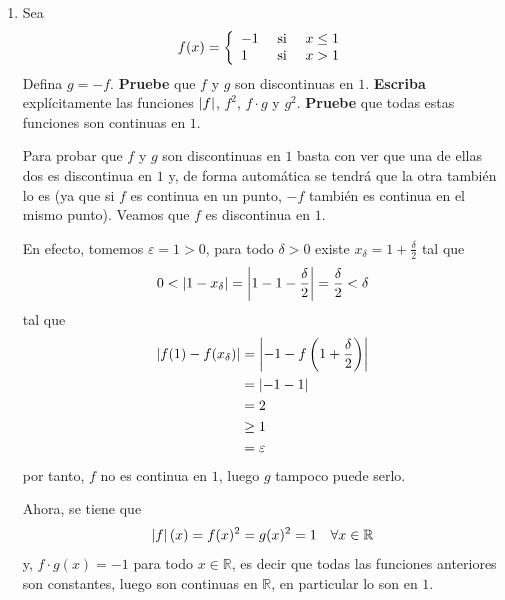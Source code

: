\documentclass[12pt]{article}
\begin{document}
\begin{enumerate}
    \item Sea
    \begin{equation*}
        f(x)=\left\{
            \begin{array}{lcr}
                -1 & \textup{ si } & x\leq 1 \\
                1 & \textup{ si } & x>1 \\
            \end{array}
        \right.
    \end{equation*}
    Defina $g=-f$. \textbf{Pruebe} que $f$ y $g$ son discontinuas en $1$. \textbf{Escriba} explícitamente las funciones $\left| f \right|$, $f^2$, $f\cdot g$ y $g^2$. \textbf{Pruebe} que todas estas funciones son continuas en $1$.

    \begin{sol}
        Para probar que $f$ y $g$ son discontinuas en $1$ basta con ver que una de ellas dos es discontinua en $1$ y, de forma automática se tendrá que la otra también lo es (ya que si $f$ es continua en un punto, $-f$ también es continua en el mismo punto). Veamos que $f$ es discontinua en $1$.
        
        En efecto, tomemos $\varepsilon=1>0$, para todo $\delta>0$ existe $x_\delta=1+\frac{\delta}{2}$ tal que
        \begin{equation*}
            \begin{split}
                0<\left| 1-x_\delta \right|=\left| 1-1-\frac{\delta}{2} \right|=\frac{\delta}{2}<\delta
            \end{split}
        \end{equation*}
        tal que
        \begin{equation*}
            \begin{split}
                \left| f(1)-f(x_\delta) \right|&=\left| -1-f\left(1+\frac{\delta}{2}\right) \right|\\
                &=\left| -1-1 \right|\\
                &=2\\
                &\geq1\\
                &=\varepsilon\\
            \end{split}
        \end{equation*}
        por tanto, $f$ no es continua en $1$, luego $g$ tampoco puede serlo.

        Ahora, se tiene que
        \begin{equation*}
            \left| f \right|(x)=f(x)^2=g(x)^2=1\quad\forall x\in\mathbb{R}
        \end{equation*}
        y, $f\cdot g(x)=-1$ para todo $x\in\mathbb{R}$, es decir que todas las funciones anteriores son constantes, luego son continuas en $\mathbb{R}$, en particular lo son en $1$.
    \end{sol}


\end{enumerate}
\end{document}
